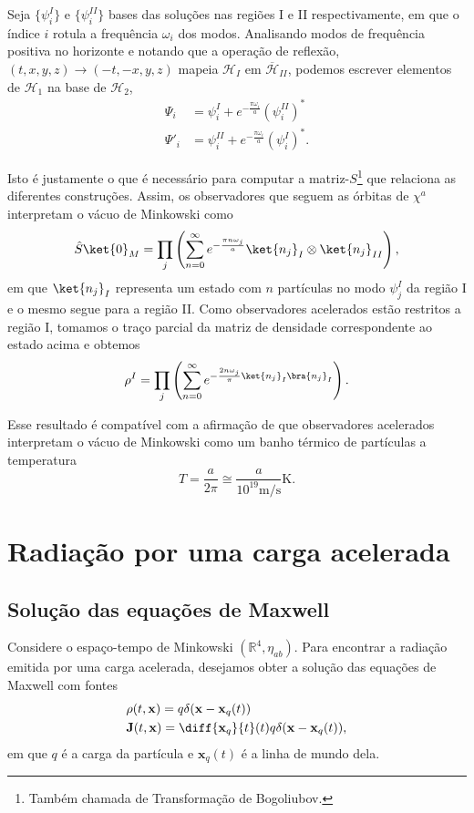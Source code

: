 \documentclass[12pt]{article}
\newcommand{\h}{\mathcal{H}}
\newcommand{\x}{\mathbf{x}}
\newcommand{\xq}{\mathbf{x}_q}
\begin{document}
Seja \(\{\psi_i^I\}\) e \(\{\psi_i^{II}\}\) bases das soluções nas regiões I e II respectivamente, em que o índice \(i\) rotula a frequência \(\omega_i\) dos modos. Analisando modos de frequência positiva no horizonte e notando que a operação de reflexão, \((t,x,y,z)\to(-t,-x,y,z)\) mapeia \(\h_I\) em \(\overline{\h}_{II}\), podemos escrever elementos de \(\h_1\) na base de \(\h_2\),
\begin{subequations}
    \begin{align}
        \Psi_i&=\psi_i^I+e^{-\frac{\pi\omega_i}{a}}\left(\psi_i^{II}\right)^*\\
        \Psi'_i&=\psi_i^{II}+e^{-\frac{\pi\omega_i}{a}}\left(\psi_i^{I}\right)^*.
    \end{align}
\end{subequations}

Isto é justamente o que é necessário para computar a matriz-\(S\)\footnote{Também chamada de Transformação de Bogoliubov.} que relaciona as diferentes construções. Assim, os observadores que seguem as órbitas de \(\chi^a\) interpretam o vácuo de Minkowski como
\begin{equation}
    \hat{S}\ket{0}_M=\prod_j\left(\sum_{n=0}^{\infty}e^{-\frac{\pi n\omega_j}{a}}\ket{n_j}_I\otimes\ket{n_j}_{II}\right),
\end{equation}
em que \(\ket{n_j}_I\) representa um estado com \(n\) partículas no modo \(\psi_j^I\) da região I e o mesmo segue para a região II. Como observadores acelerados estão restritos a região I, tomamos o traço parcial da matriz de densidade correspondente ao estado acima e obtemos
\begin{equation}
    \rho^I=\prod_j\left(\sum_{n=0}^{\infty}e^{-\frac{2n\omega_j}{\pi}\ket{n_j}_I\bra{n_j}_I}\right).
\end{equation}

Esse resultado é compatível com a afirmação de que observadores acelerados interpretam o vácuo de Minkowski como um banho térmico de partículas a temperatura
\begin{equation}
    T=\frac{a}{2\pi}\cong\frac{a}{10^{19}\unit{\meter/\second}}\unit{\kelvin}.
\end{equation}

\section{Radiação por uma carga acelerada}\label{sec:eletro}
\subsection*{Solução das equações de Maxwell}
Considere o espaço-tempo de Minkowski \((\mathbb{R}^4,\eta_{ab})\). Para encontrar a radiação emitida por uma carga acelerada, desejamos obter a solução das equações de Maxwell com fontes
\begin{subequations}
    \begin{align}
        &\rho(t,\x)=q\delta(\x-\xq(t))\\
        &\mathbf{J}(t,\x)=\diff{\xq}{t}(t)q\delta(\x-\xq(t)),
    \end{align}
\end{subequations}
em que \(q\) é a carga da partícula e \(\xq(t)\) é a linha de mundo dela.
\end{document}
